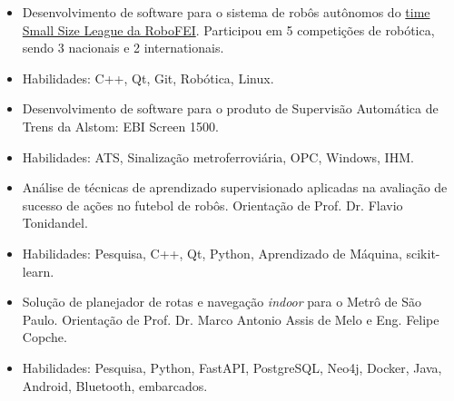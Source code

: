 \documentclass[10pt,a4paper,ragged2e,withhyper]{altacv}
\begin{document}
\begin{paracol}{2}

\begin{itemize}
  \item Desenvolvimento de software para o sistema de robôs autônomos do \href{https://gitlab.com/robofei/ssl}{time Small Size League da RoboFEI}. Participou em 5 competições de robótica, sendo 3 nacionais e 2 internationais.
  \item Habilidades: C++, Qt, Git, Robótica, Linux.
\end{itemize}

\divider

\begin{itemize}
\item Desenvolvimento de software para o produto de Supervisão Automática de Trens da Alstom: EBI Screen 1500.
\item Habilidades: ATS, Sinalização metroferroviária, OPC, Windows, IHM.
\end{itemize}


\begin{itemize}
\item Análise de técnicas de aprendizado supervisionado aplicadas na avaliação de sucesso de ações no futebol de robôs. Orientação de Prof. Dr. Flavio Tonidandel.
\item Habilidades: Pesquisa, C++, Qt, Python, Aprendizado de Máquina, scikit-learn.
\end{itemize}

\divider

\begin{itemize}
  \item Solução de planejador de rotas e navegação \emph{indoor} para o Metrô de São Paulo. Orientação de Prof. Dr. Marco Antonio Assis de Melo e Eng. Felipe Copche.
  \item Habilidades: Pesquisa, Python, FastAPI, PostgreSQL, Neo4j, Docker, Java, Android, Bluetooth, embarcados.
\end{itemize}
  

\end{paracol}
\end{document}
